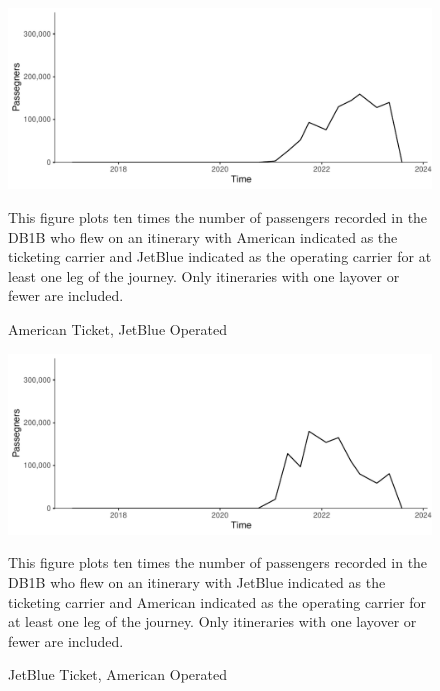 \documentclass{article}
\begin{document}
\begin{appendices}
	
	\begin{figure}
		\caption{American Ticket, JetBlue Operated}
		\label{fig:NEA_Mix_AAB6}
		\includegraphics[width = \linewidth]{NEA_AATk_B6Op.pdf}
		\begin{minipage}{\textwidth} %
			{\footnotesize This figure plots ten times the number of passengers recorded in the DB1B who flew on an itinerary with American indicated as the ticketing carrier and JetBlue indicated as the operating carrier for at least one leg of the journey. Only itineraries with one layover or fewer are included. }
		\end{minipage}
	\end{figure}
	
	\begin{figure}
		\caption{JetBlue Ticket, American Operated}
		\label{fig:NEA_Mix_B6AA}
		\includegraphics[width = \linewidth]{NEA_B6TK_AAOp.pdf}
		\begin{minipage}{\textwidth} %
			{\footnotesize This figure plots ten times the number of passengers recorded in the DB1B who flew on an itinerary with JetBlue indicated as the ticketing carrier and American indicated as the operating carrier for at least one leg of the journey. Only itineraries with one layover or fewer are included. }
		\end{minipage}
	\end{figure}
	

\end{appendices}
\end{document}

